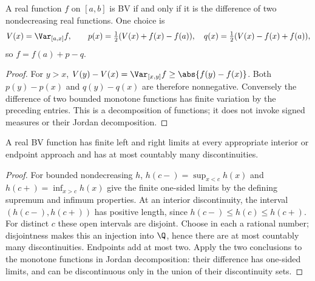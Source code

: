 \begin{theorem}
A real function $f$ on $[a,b]$ is BV if and only if it is the difference of two nondecreasing real functions. One choice is
\[V(x)=\Var_{[a,x]}f,\qquad p(x)=\tfrac12(V(x)+f(x)-f(a)),\quad q(x)=\tfrac12(V(x)-f(x)+f(a)),\]
so $f=f(a)+p-q$.
\end{theorem}
\begin{proof}
For $y>x$, $V(y)-V(x)=\Var_{[x,y]}f\geq\abs{f(y)-f(x)}$. Both $p(y)-p(x)$ and $q(y)-q(x)$ are therefore nonnegative. Conversely the difference of two bounded monotone functions has finite variation by the preceding entries. This is a decomposition of functions; it does not invoke signed measures or their Jordan decomposition.
\end{proof}

\begin{theorem}
A real BV function has finite left and right limits at every appropriate interior or endpoint approach and has at most countably many discontinuities.
\end{theorem}
\begin{proof}
For bounded nondecreasing $h$, $h(c-)=\sup_{x<c}h(x)$ and $h(c+)=\inf_{x>c}h(x)$ give the finite one-sided limits by the defining supremum and infimum properties. At an interior discontinuity, the interval $(h(c-),h(c+))$ has positive length, since $h(c-)\leq h(c)\leq h(c+)$. For distinct $c$ these open intervals are disjoint. Choose in each a rational number; disjointness makes this an injection into $\Q$, hence there are at most countably many discontinuities. Endpoints add at most two. Apply the two conclusions to the monotone functions in Jordan decomposition: their difference has one-sided limits, and can be discontinuous only in the union of their discontinuity sets.
\end{proof}

